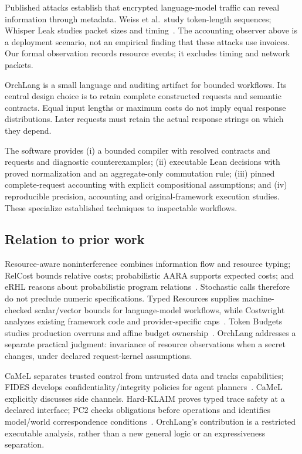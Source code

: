 \documentclass[preprint,12pt,a4paper]{elsarticle}
\begin{document}
Published attacks establish that encrypted language-model traffic can reveal
information through metadata. Weiss et al.\ study token-length sequences;
Whisper Leak studies packet sizes and timing~\cite{weiss,whisper}.
The accounting observer above is a deployment scenario, not an empirical
finding that these attacks use invoices. Our formal observation records
resource events; it excludes timing and network packets.

OrchLang is a small language and auditing artifact for bounded workflows.
Its central design choice is to retain complete constructed requests and
semantic contracts. Equal input lengths or maximum costs do not imply equal
response distributions. Later requests must retain the actual response strings
on which they depend.

The software provides (i) a bounded compiler with resolved contracts and
requests and diagnostic counterexamples; (ii) executable Lean decisions with
proved normalization and an aggregate-only commutation rule; (iii) pinned
complete-request accounting with explicit compositional assumptions; and
(iv) reproducible precision, accounting and original-framework execution
studies. These specialize established techniques to inspectable workflows.

\subsection{Relation to prior work}
Resource-aware noninterference combines information flow and resource typing;
RelCost bounds relative costs; probabilistic AARA supports expected costs;
and eRHL reasons about probabilistic program
relations~\cite{ngo,relcost,wang,erhl}. Stochastic calls therefore do not preclude
numeric specifications. Typed Resources supplies machine-checked scalar/vector
bounds for language-model workflows, while Costwright analyzes existing
framework code and provider-specific caps~\cite{typedresources,costwright}.
Token Budgets studies production overruns and affine budget
ownership~\cite{tokenbudgets}. OrchLang addresses a separate practical judgment:
invariance of resource observations when a secret changes, under declared
request-kernel assumptions.

CaMeL separates trusted control from untrusted data and tracks capabilities;
FIDES develops confidentiality/integrity policies for agent
planners~\cite{camel,fides}. CaMeL explicitly discusses side channels.
Hard-KLAIM proves typed trace safety at a declared interface; PC2 checks
obligations before operations and identifies model/world correspondence
conditions~\cite{hard,pc2}. OrchLang's contribution is a restricted executable
analysis, rather than a new general logic or an expressiveness separation.
\end{document}
